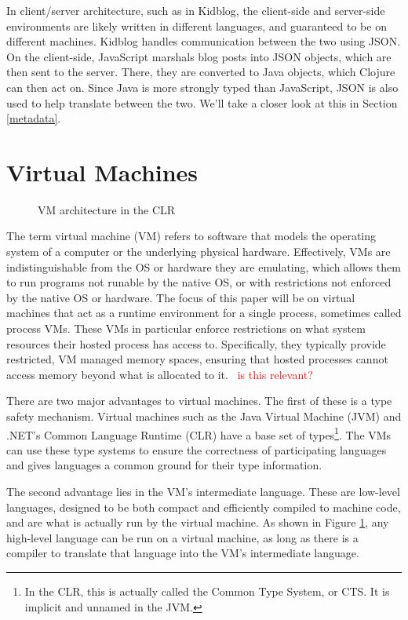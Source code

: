 \documentclass{sig-alternate}
\newcommand{\mycomment}[1]{\textcolor{red}{#1}}
\begin{document}
In client/server architecture, such as in Kidblog, the client-side and server-side environments are likely written in different languages, and guaranteed to be on different machines. Kidblog handles communication between the two using JSON. On the client-side, JavaScript marshals blog posts into JSON objects, which are then sent to the server. There, they are converted to Java objects, which Clojure can then act on. Since Java is more strongly typed than JavaScript, JSON is also used to help translate between the two. We'll take a closer look at this in Section \ref{metadata}.



\section{Virtual Machines}\label{VM}
\begin{figure}
\caption{VM architecture in the CLR~\cite{wiki:CLR}}
\label{VMmodel}
\end{figure}

The term virtual machine (VM) refers to software that models the operating system of a computer or the underlying physical hardware. Effectively, VMs are indistinguishable from the OS or hardware they are emulating, which allows them to run programs not runable by the native OS, or with restrictions not enforced by the native OS or hardware.
The focus of this paper will be on virtual machines that act as a runtime environment for a single process, sometimes called process VMs. These VMs in particular enforce restrictions on what system resources their hosted process has access to. Specifically, they typically provide restricted, VM managed memory spaces, ensuring that hosted processes cannot access memory beyond what is allocated to it.~\cite{wiki:VM} \mycomment{is this relevant?}

There are two major advantages to virtual machines. The first of these is a type safety mechanism. Virtual machines such as the Java Virtual Machine (JVM) and .NET's Common Language Runtime (CLR) have a base set of types\footnote{In the CLR, this is actually called the Common Type System, or CTS. It is implicit and unnamed in the JVM.}. The VMs can use these type systems to ensure the correctness of participating languages and gives languages a common ground for their type information.

The second advantage lies in the VM's intermediate language. These are low-level languages, designed to be both compact and efficiently compiled to machine code, and are what is actually run by the virtual machine. As shown in Figure \ref{VMmodel}, any high-level language can be run on a virtual machine, as long as there is a compiler to translate that language into the VM's intermediate language.
\end{document}
